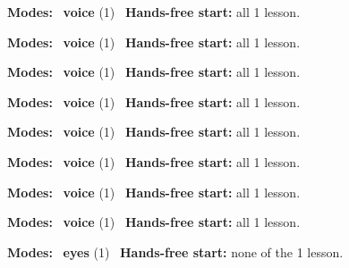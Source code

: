 \expandafter\def\csname hlchaptermodality231\endcsname{%
  {\small\noindent
    \textbf{Modes:} \hlvoicesign{}~\textbf{voice} (1)\quad
    \hlvoicesign{}~\textbf{Hands-free start:} all 1 lesson.%
    \par}\medskip
}

\expandafter\def\csname hlchaptermodality232\endcsname{%
  {\small\noindent
    \textbf{Modes:} \hlvoicesign{}~\textbf{voice} (1)\quad
    \hlvoicesign{}~\textbf{Hands-free start:} all 1 lesson.%
    \par}\medskip
}

\expandafter\def\csname hlchaptermodality233\endcsname{%
  {\small\noindent
    \textbf{Modes:} \hlvoicesign{}~\textbf{voice} (1)\quad
    \hlvoicesign{}~\textbf{Hands-free start:} all 1 lesson.%
    \par}\medskip
}

\expandafter\def\csname hlchaptermodality234\endcsname{%
  {\small\noindent
    \textbf{Modes:} \hlvoicesign{}~\textbf{voice} (1)\quad
    \hlvoicesign{}~\textbf{Hands-free start:} all 1 lesson.%
    \par}\medskip
}

\expandafter\def\csname hlchaptermodality235\endcsname{%
  {\small\noindent
    \textbf{Modes:} \hlvoicesign{}~\textbf{voice} (1)\quad
    \hlvoicesign{}~\textbf{Hands-free start:} all 1 lesson.%
    \par}\medskip
}

\expandafter\def\csname hlchaptermodality236\endcsname{%
  {\small\noindent
    \textbf{Modes:} \hlvoicesign{}~\textbf{voice} (1)\quad
    \hlvoicesign{}~\textbf{Hands-free start:} all 1 lesson.%
    \par}\medskip
}

\expandafter\def\csname hlchaptermodality237\endcsname{%
  {\small\noindent
    \textbf{Modes:} \hlvoicesign{}~\textbf{voice} (1)\quad
    \hlvoicesign{}~\textbf{Hands-free start:} all 1 lesson.%
    \par}\medskip
}

\expandafter\def\csname hlchaptermodality238\endcsname{%
  {\small\noindent
    \textbf{Modes:} \hlvoicesign{}~\textbf{voice} (1)\quad
    \hlvoicesign{}~\textbf{Hands-free start:} all 1 lesson.%
    \par}\medskip
}

\expandafter\def\csname hlchaptermodality239\endcsname{%
  {\small\noindent
    \textbf{Modes:} \hlsightsign{}~\textbf{eyes} (1)\quad
    \hlvoicesign{}~\textbf{Hands-free start:} none of the 1 lesson.%
    \par}\medskip
}


